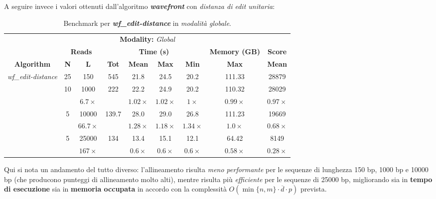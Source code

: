    \vspace{20pt} 
    A seguire invece i valori ottenuti dall'algoritmo \textbf{\textit{wavefront}} con \emph{distanza di edit unitaria}:
    \vspace{20pt}
    \begin{table}[h]
        \centering
        \begin{tabular}{|c|c|c|c|c|c|c|c|c|}
        \hline
        \multicolumn{9}{|c|}{\multirow{2}{*}{\textbf{Modality:} \emph{Global}}} \\
        \multicolumn{9}{|c|}{} \\
        \hline
        & \multicolumn{2}{|c|}{\textbf{Reads}} & \multicolumn{4}{|c|}{\textbf{Time (s)}} & \textbf{Memory (GB)} & \textbf{Score} \\
        \hline
        \textbf{Algorithm} & \textbf{N} & \textbf{L} & \textbf{Tot} & \textbf{Mean} & \textbf{Max} & \textbf{Min} & \textbf{Max} & \textbf{Mean} \\
        \hline
        \multirow{4}{*}{\emph{wf\_edit-distance}} & 25 & 150 & 545 & 21.8 & 24.5 & 20.2 & 111.33 & 28879 \\
        \cline{2-9}
        & \multirow{2}{*}{10} & 1000 & \multirow{2}{*}{222} & 22.2 & 24.9 & 20.2 & 110.32 & 28029 \\
        & & $6.7 \times$ & & $1.02 \times$ & $1.02 \times$ & $1 \times$ & $0.99 \times$ & $0.97 \times$\\
        \cline{2-9}
        & \multirow{2}{*}{5} & 10000 & \multirow{2}{*}{139.7} & 28.0 & 29.0 & 26.8 & 111.23 & 19669 \\
        & & $66.7 \times$ & & $1.28 \times$ & $1.18 \times$ & $1.34 \times$ & $1.0 \times$ & $0.68 \times$\\
        \cline{2-9}
        & \multirow{2}{*}{5} & 25000 & \multirow{2}{*}{134} & 13.4 & 15.1 & 12.1 & 64.42 & 8149\\
        & & $167 \times$ & & $0.6 \times$ & $0.6 \times$ & $0.6 \times$ & $0.58 \times$ & $0.28 \times$ \\
        \hline
        \end{tabular}
        \caption{Benchmark per \textbf{\textit{wf\_edit-distance}} in \emph{modalità globale}.}
        \label{tab:benchmark_wf_edit-dist_global}
    \end{table}
    \vspace{10pt}

    Qui si nota un andamento del tutto diverso: l'allineamento risulta \emph{meno performante} per le sequenze di lunghezza 150 bp, 1000 bp e 10000 bp (che producono punteggi di allineamento molto alti), mentre risulta più \emph{efficiente} per le sequenze di 25000 bp, migliorando sia in \textbf{tempo di esecuzione} sia in \textbf{memoria occupata} in accordo con la complessità $O(\min\{n, m\} \cdot \overline{d} \cdot p)$ prevista. 

